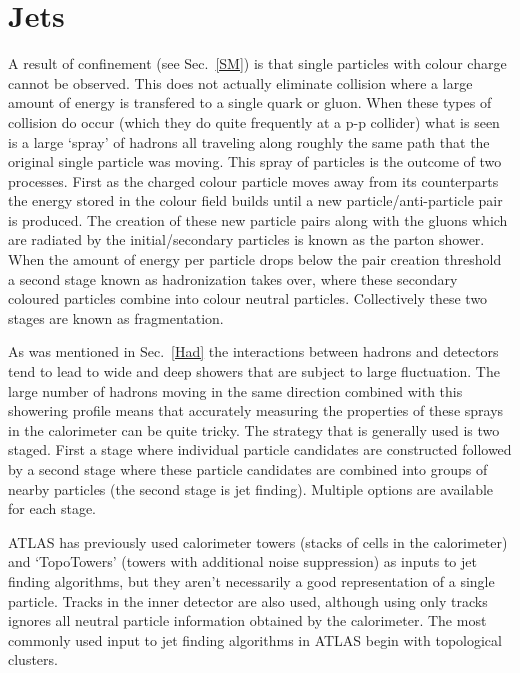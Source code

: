 \section{Jets}
\label{jets}

A result of confinement (see Sec.~\ref{SM}) is that single particles with colour charge cannot be observed.  
This does not actually eliminate collision where a large amount of energy is transfered to a single quark or gluon.  
When these types of collision do occur (which they do quite frequently at a p-p collider) what is seen is a large `spray' of hadrons all traveling along roughly the same path that the original single particle was moving.  
This spray of particles is the outcome of two processes.  
First as the charged colour particle moves away from its counterparts the energy stored in the colour field builds until a new particle/anti-particle pair is produced.  
The creation of these new particle pairs along with the gluons which are radiated by the initial/secondary particles is known as the parton shower.  
When the amount of energy per particle drops below the pair creation threshold a second stage known as hadronization takes over, where these secondary coloured particles combine into colour neutral particles.  
Collectively these two stages are known as fragmentation.  

As was mentioned in Sec.~\ref{Had} the interactions between hadrons and detectors tend to lead to wide and deep showers that are subject to large fluctuation.  
The large number of hadrons moving in the same direction combined with this showering profile means that accurately measuring the properties of these sprays in the calorimeter can be quite tricky.  
The strategy that is generally used is two staged.  
First a stage where individual particle candidates are constructed followed by a second stage where these particle candidates are combined into groups of nearby particles (the second stage is jet finding).  
Multiple options are available for each stage.  

ATLAS has previously used calorimeter towers (stacks of cells in the calorimeter) and `TopoTowers' (towers with additional noise suppression) as inputs to jet finding algorithms, but they aren't necessarily a good representation of a single particle.  
Tracks in the inner detector are also used, although using only tracks ignores all neutral particle information obtained by the calorimeter.  
The most commonly used input to jet finding algorithms in ATLAS begin with topological clusters.  
 
